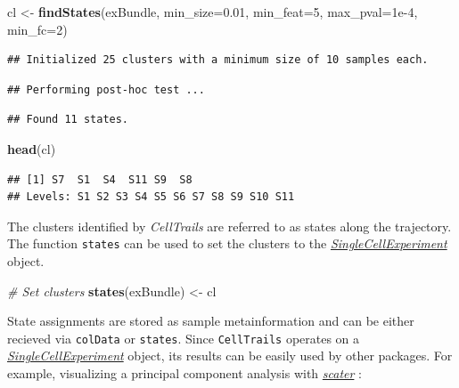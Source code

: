 \documentclass[]{book}
\newenvironment{Shaded}{\begin{snugshade}}{\end{snugshade}}
\newcommand{\KeywordTok}[1]{\textcolor[rgb]{0.13,0.29,0.53}{\textbf{#1}}}
\newcommand{\DataTypeTok}[1]{\textcolor[rgb]{0.13,0.29,0.53}{#1}}
\newcommand{\DecValTok}[1]{\textcolor[rgb]{0.00,0.00,0.81}{#1}}
\newcommand{\FloatTok}[1]{\textcolor[rgb]{0.00,0.00,0.81}{#1}}
\newcommand{\StringTok}[1]{\textcolor[rgb]{0.31,0.60,0.02}{#1}}
\newcommand{\CommentTok}[1]{\textcolor[rgb]{0.56,0.35,0.01}{\textit{#1}}}
\newcommand{\NormalTok}[1]{#1}
\theoremstyle{definition}
\theoremstyle{definition}
\theoremstyle{definition}
\theoremstyle{remark}
\begin{document}
\begin{Shaded}
\begin{Highlighting}[]
\NormalTok{cl <-}\StringTok{ }\KeywordTok{findStates}\NormalTok{(exBundle, }\DataTypeTok{min_size=}\FloatTok{0.01}\NormalTok{, }\DataTypeTok{min_feat=}\DecValTok{5}\NormalTok{, }\DataTypeTok{max_pval=}\FloatTok{1e-4}\NormalTok{, }\DataTypeTok{min_fc=}\DecValTok{2}\NormalTok{)}
\end{Highlighting}
\end{Shaded}

\begin{verbatim}
## Initialized 25 clusters with a minimum size of 10 samples each.
\end{verbatim}

\begin{verbatim}
## Performing post-hoc test ...
\end{verbatim}

\begin{verbatim}
## Found 11 states.
\end{verbatim}

\begin{Shaded}
\begin{Highlighting}[]
\KeywordTok{head}\NormalTok{(cl)}
\end{Highlighting}
\end{Shaded}

\begin{verbatim}
## [1] S7  S1  S4  S11 S9  S8 
## Levels: S1 S2 S3 S4 S5 S6 S7 S8 S9 S10 S11
\end{verbatim}

The clusters identified by \emph{CellTrails} are referred to as states
along the trajectory. The function \texttt{states} can be used to set
the clusters to the
\emph{\href{http://bioconductor.org/packages/SingleCellExperiment}{SingleCellExperiment}}
object.

\begin{Shaded}
\begin{Highlighting}[]
\CommentTok{# Set clusters}
\KeywordTok{states}\NormalTok{(exBundle) <-}\StringTok{ }\NormalTok{cl}
\end{Highlighting}
\end{Shaded}

State assignments are stored as sample metainformation and can be either
recieved via \texttt{colData} or \texttt{states}. Since
\texttt{CellTrails} operates on a
\emph{\href{http://bioconductor.org/packages/SingleCellExperiment}{SingleCellExperiment}}
object, its results can be easily used by other packages. For example,
visualizing a principal component analysis with
\emph{\href{http://bioconductor.org/packages/scater}{scater}}
\citep{scater}:
\end{document}
